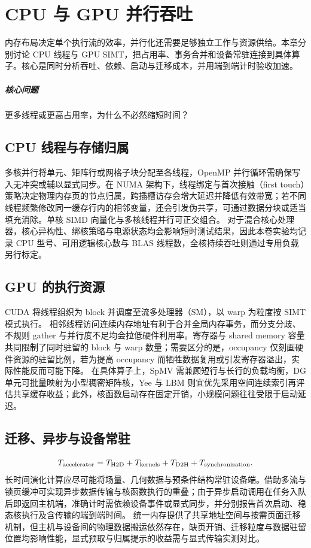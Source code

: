 \chapter{CPU 与 GPU 并行吞吐}\label{v0ch:27}
\begin{chaptersummary}
内存布局决定单个执行流的效率，并行化还需要足够独立工作与资源供给。本章分别讨论 CPU 线程与 GPU SIMT，把占用率、事务合并和设备常驻连接到具体算子。核心是同时分析吞吐、依赖、启动与迁移成本，并用端到端计时验收加速。
\end{chaptersummary}
\paragraph{核心问题}更多线程或更高占用率，为什么不必然缩短时间？

\section{CPU 线程与存储归属}
多核并行将单元、矩阵行或网格子块分配至各线程，OpenMP 并行循环需确保写入无冲突或辅以显式同步。在 NUMA 架构下，线程绑定与首次接触（first touch）策略决定物理内存页的节点归属，跨插槽访存会增大延迟并降低有效带宽；若不同线程频繁修改同一缓存行内的相邻变量，还会引发伪共享，可通过数据分块或适当填充消除。单核 SIMD 向量化与多核线程并行可正交组合。
对于混合核心处理器，核心异构性、绑核策略与电源状态均会影响短时测试结果，因此本卷实验均记录 CPU 型号、可用逻辑核心数与 BLAS 线程数，全核持续吞吐则通过专用负载另行标定。
\section{GPU 的执行资源}
CUDA 将线程组织为 block 并调度至流多处理器（SM），以 warp 为粒度按 SIMT 模式执行。\cite{cuda}
相邻线程访问连续内存地址有利于合并全局内存事务，而分支分歧、不规则 gather 与并行度不足均会拉低硬件利用率。寄存器与 shared memory 容量共同限制了同时驻留的 block 与 warp 数量；需要区分的是，occupancy 仅刻画硬件资源的驻留比例，若为提高 occupancy 而牺牲数据复用或引发寄存器溢出，实际性能反而可能下降。
在具体算子上，SpMV 需兼顾短行与长行的负载均衡，DG 单元可批量映射为小型稠密矩阵核，Yee 与 LBM 则宜优先采用空间连续索引再评估共享缓存收益；此外，核函数启动存在固定开销，小规模问题往往受限于启动延迟。
\section{迁移、异步与设备常驻}
\[
 T_{\rm accelerator}=T_{\rm H2D}+T_{\rm kernels}
 +T_{\rm D2H}+T_{\rm synchronization}.
\]
长时间演化计算应尽可能将场量、几何数据与预条件结构常驻设备端。借助多流与锁页缓冲可实现异步数据传输与核函数执行的重叠；由于异步启动调用在任务入队后即返回主机端，准确计时需依赖设备事件或显式同步，并分别报告首次启动、稳态核执行及含传输的端到端时间。
统一内存提供了共享地址空间与按需页面迁移机制，但主机与设备间的物理数据搬运依然存在，缺页开销、迁移粒度与数据驻留位置均影响性能，显式预取与归属提示的收益需与显式传输实测对比。
